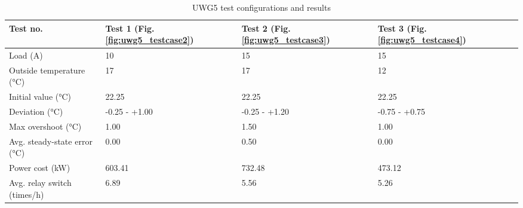 \documentclass[../main.tex]{subfiles}
\begin{document}
\begin{table}[htbp]
\centering
\caption{UWG5 test configurations and results}
\begin{tabularx}{\textwidth}{|X|X|X|X|X|}
    \hline
    \textbf{Test no.} & \textbf{Test 1} (Fig. \ref{fig:uwg5_testcase2}) & \textbf{Test 2} (Fig. \ref{fig:uwg5_testcase3}) & \textbf{Test 3} (Fig. \ref{fig:uwg5_testcase4}) \\
    \hline
    Load (A) & 10 & 15 & 15 \\
    \hline
    Outside temperature (°C) & 17 & 17 & 12 \\
    \hline
    Initial value (°C) & 22.25 & 22.25 & 22.25 \\
    \hline \hline
    Deviation (°C) & -0.25 - +1.00 & -0.25 - +1.20 & -0.75 - +0.75 \\
    \hline
    Max overshoot (°C) & 1.00 & 1.50 & 1.00 \\
    \hline
    Avg. steady-state error (°C) & 0.00 & 0.50 & 0.00 \\
    \hline
    Power cost (kW) & 603.41 & 732.48 & 473.12 \\
    \hline
    Avg. relay switch (times/h) & 6.89 & 5.56 & 5.26 \\
    \hline
\end{tabularx}
\label{tab:uwg5_baselines}
\end{table}
\end{document}

